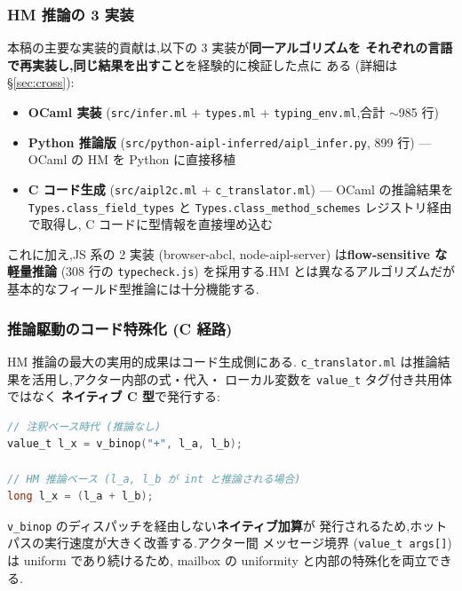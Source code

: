\documentclass[11pt,a4paper]{article}
\newcommand{\code}[1]{\texttt{\small #1}}
\begin{document}
\subsubsection{HM 推論の 3 実装}

本稿の主要な実装的貢献は,以下の 3 実装が\textbf{同一アルゴリズムを
それぞれの言語で再実装し,同じ結果を出すこと}を経験的に検証した点に
ある (詳細は \S\ref{sec:cross}):

\begin{itemize}[leftmargin=*,itemsep=0pt]
  \item \textbf{OCaml 実装} (\code{src/infer.ml} + \code{types.ml}
    + \code{typing\_env.ml},合計 $\sim$985 行)
  \item \textbf{Python 推論版} (\code{src/python-aipl-inferred/aipl\_infer.py},
    899 行) --- OCaml の HM を Python に直接移植
  \item \textbf{C コード生成} (\code{src/aipl2c.ml} + \code{c\_translator.ml})
    --- OCaml の推論結果を \code{Types.class\_field\_types} と
    \code{Types.class\_method\_schemes} レジストリ経由で取得し,
    C コードに型情報を直接埋め込む
\end{itemize}

これに加え,JS 系の 2 実装 (browser-abcl, node-aipl-server) は\textbf{flow-sensitive な軽量推論}
(308 行の \code{typecheck.js}) を採用する.HM とは異なるアルゴリズムだが
基本的なフィールド型推論には十分機能する.

\subsubsection{推論駆動のコード特殊化 (C 経路)}

HM 推論の最大の実用的成果はコード生成側にある.
\code{c\_translator.ml} は推論結果を活用し,アクター内部の式・代入・
ローカル変数を \code{value\_t} タグ付き共用体ではなく
\textbf{ネイティブ C 型}で発行する:

\begin{lstlisting}[language=c]
// 注釈ベース時代 (推論なし)
value_t l_x = v_binop("+", l_a, l_b);

// HM 推論ベース (l_a, l_b が int と推論される場合)
long l_x = (l_a + l_b);
\end{lstlisting}

\code{v\_binop} のディスパッチを経由しない\textbf{ネイティブ加算}が
発行されるため,ホットパスの実行速度が大きく改善する.アクター間
メッセージ境界 (\code{value\_t args[]}) は uniform であり続けるため,
mailbox の uniformity と内部の特殊化を両立できる.
\end{document}
